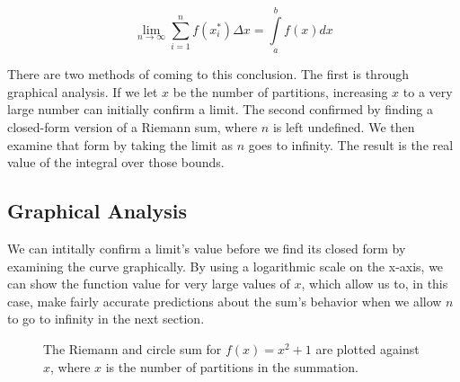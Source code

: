 \documentclass[12pt]{article}
\begin{document}
    \[ \displaystyle\lim_{n \to \infty}\sum_{i=1}^{n} f(x^*_i) \Delta x = \int\limits_a^b f(x)dx \]

    There are two methods of coming to this conclusion. The first is through graphical analysis. If we let \( x \) be the number of partitions, increasing \( x \) to a very large number can initially confirm a limit. The second confirmed by finding a closed-form version of a Riemann sum, where \( n \) is left undefined. We then examine that form by taking the limit as \( n \) goes to infinity. The result is the real value of the integral over those bounds.

    \subsection{Graphical Analysis}
      We can intitally confirm a limit's value before we find its closed form by examining the curve graphically. By using a logarithmic scale on the x-axis, we can show the function value for very large values of \( x \), which allow us to, in this case, make fairly accurate predictions about the sum's behavior when we allow \( n \) to go to infinity in the next section.

      \begin{figure}[h]
        \centering
        \caption{The Riemann and circle sum for \( f(x) = x^2+1 \) are plotted against \( x \), where \( x \) is the number of partitions in the summation.}
      \end{figure}
      \begin{center}
      \end{center}
\end{document}
